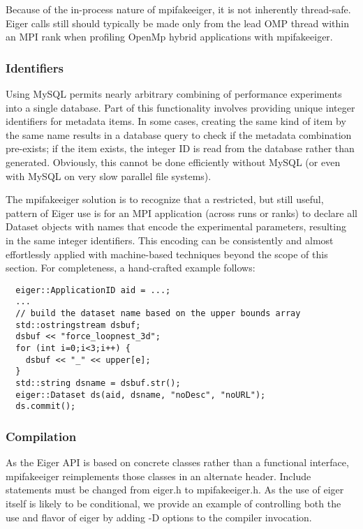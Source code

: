 Because of the in-process nature of mpifakeeiger, it is not inherently thread-safe. Eiger calls still should typically be made only from the lead OMP thread within an MPI rank when profiling OpenMp hybrid applications with mpifakeeiger.


\subsubsection{Identifiers} Using MySQL permits nearly arbitrary combining of performance experiments into a single database. Part of this functionality involves providing unique integer identifiers for metadata items. In some cases, creating the same kind of item by the same name results in a database query to check if the metadata combination pre-exists; if the item exists, the integer ID is read from the database rather than generated. Obviously, this cannot be done efficiently without MySQL (or even with MySQL on very slow parallel file systems). 

The mpifakeeiger solution is to recognize that a restricted, but still useful, pattern of Eiger use is for an MPI application (across runs or ranks) to declare all Dataset objects with names that encode the experimental parameters, resulting in the same integer identifiers. This encoding can be consistently and almost effortlessly applied with machine-based techniques \cite{lwperf} beyond the scope of this section. For completeness, a hand-crafted example follows:
\begin{verbatim}
  eiger::ApplicationID aid = ...;
  ...
  // build the dataset name based on the upper bounds array
  std::ostringstream dsbuf;
  dsbuf << "force_loopnest_3d";
  for (int i=0;i<3;i++) {
    dsbuf << "_" << upper[e];
  }
  std::string dsname = dsbuf.str();
  eiger::Dataset ds(aid, dsname, "noDesc", "noURL");
  ds.commit();
\end{verbatim}



\subsubsection{Compilation} As the Eiger API is based on concrete classes rather than a functional interface, mpifakeeiger reimplements those classes in an alternate header. Include statements must be changed from eiger.h to mpifakeeiger.h. As the use of eiger itself is likely to be conditional, we provide an example of controlling both the use and flavor of eiger by adding -D options to the compiler invocation.

